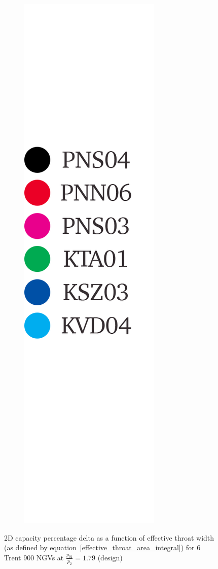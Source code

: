 \documentclass[a4paper, 11pt, oneside]{report}
\begin{document}
\begin{figure}[H]
\begin{subfigure}{.1125\textwidth}
		\includegraphics[width=\linewidth]{figs/t900_2d_capacity_trends_legend.png}
	\end{subfigure}
	\caption{2D capacity percentage delta as a function of effective throat width (as defined by equation~\ref{effective_throat_area_integral}) for 6 Trent 900 NGVs at $\frac{p_{01}}{p_2}=1.79$ (design)}
      \label{fig:T900_2d_capacities_vs_effective_throat_widths}
\end{figure}
\end{document}
